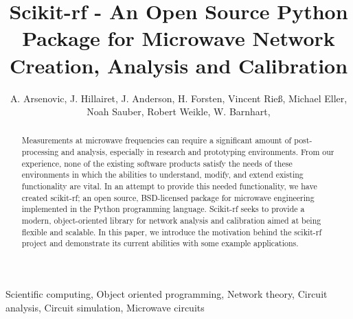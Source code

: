 \documentclass[journal, onecolumn]{IEEEtran}
\begin{document}
\title{Scikit-rf - An Open Source Python Package for Microwave Network Creation, Analysis and Calibration} 

%
\author{A. Arsenovic, %
	    J. Hillairet, %
		J. Anderson, %
		H. Forsten, %
		Vincent Rieß, %
 		Michael Eller, %
		Noah Sauber, %
		Robert Weikle, %
		W. Barnhart, %
	}


\maketitle

\begin{abstract}
Measurements at microwave frequencies can require a  significant  amount of post-processing  and  analysis,  especially  in research  and  prototyping environments.  From  our  experience, none  of   the   existing   software   products  satisfy   the   needs   of these environments in which the abilities to understand, modify, and  extend  existing  functionality  are  vital.  In  an  attempt  to provide this  needed  functionality,  we  have  created  scikit-rf;  an open  source,  BSD-licensed  package  for  microwave  engineering implemented   in   the   Python  programming   language.   Scikit-rf seeks  to  provide  a  modern,  object-oriented  library  for  network analysis  and  calibration  aimed  at  being  flexible  and scalable. In  this  paper,  we  introduce  the  motivation  behind  the  scikit-rf  project   and   demonstrate  its  current   abilities   with   some example applications.
\end{abstract}

\begin{IEEEkeywords}
Scientific computing, Object oriented programming, Network theory, Circuit analysis, Circuit simulation, Microwave circuits
\end{IEEEkeywords}
\end{document}
